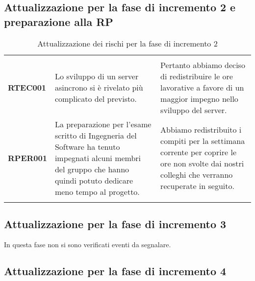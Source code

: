 \documentclass[../piano-di-progetto]{subfiles}
\begin{document}
\subsection{Attualizzazione per la fase di incremento 2 e preparazione alla RP}%
\label{sub:attualizzazione_per_la_fase_di_incremento_2 e preparazione alla RP}

\begin{longtable}[H]{|p{10em}|p{17em}|p{17em}|}
  \rowcolor{darkgray!90!}
  \color{white}{\textbf{Rischio}} & \color{white}{\textbf{Gestione}}                                                                                                                                                        & \color{white}{\textbf{Monitoraggio}}                                                       \\
  \textbf{RTEC001}                & Lo sviluppo di un server asincrono si è rivelato più complicato del previsto. &  Pertanto abbiamo deciso di redistribuire le ore lavorative a favore di un maggior impegno nello sviluppo del server. \\
  \rowcolor{white}
  \textbf{RPER001}                & La preparazione per l'esame scritto di Ingegneria del Software ha tenuto impegnati alcuni membri del gruppo che hanno quindi potuto dedicare meno tempo al progetto. & Abbiamo redistribuito i compiti per la settimana corrente per coprire le ore non svolte dai nostri colleghi che verranno recuperate in seguito.\\
  \caption{Attualizzazione dei rischi per la fase di incremento 2}%
  \label{tab:attualizzazione_per_la_fase_di_incremento_2}
\end{longtable}

\subsection{Attualizzazione per la fase di incremento 3}%
\label{sub:attualizzazione_per_la_fase_di_incremento_3}
In questa fase non si sono verificati eventi da segnalare.
\subsection{Attualizzazione per la fase di incremento 4}%
\label{sub:attualizzazione_per_la_fase_di_incremento_4}
\end{document}
